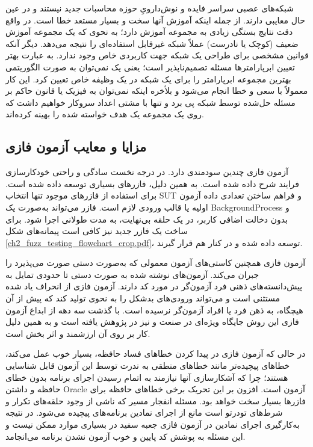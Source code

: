شبکه‌های عصبی سراسر فایده و نوش‌دارویِ حوزه محاسبات جدید نیستند و در عین حال معایبی دارند. از جمله اینکه آموزش آنها سخت و بسیار مستعد خطا است. در واقع دقت نتایج بستگی زیادی به مجموعه آموزش دارد؛ به نحوی که یک مجموعه آموزش ضعیف (کوچک یا نادرست) عملاً شبکه غیرقابل استفاده‌ای را نتیجه می‌دهد. دیگر آنکه قوانین مشخصی برای طراحی یک شبکه جهت کاربردی خاص وجود ندارد. به عبارت بهتر تعیین ابرپارامترها مسئله تصمیم‌ناپذیر است؛ یعنی یک نمی‌توان به صورت الگوریتمی بهترین مجموعه ابرپارامتر را برای یک شبکه در یک وظیفه خاص تعیین کرد. این کار معمولاً با سعی و خطا انجام می‌شود و بلأخره اینکه نمی‌توان به فیزیک یا قانون حاکم بر مسئله حل‌شده توسط شبکه پی برد و تنها با مشتی اعداد سروکار خواهیم داشت که روی یک مجموعه یک هدف خواسته شده را بهینه کرده‌اند. 


\subsection{مزایا و معایب آزمون فازی}
آزمون فازی چندین سودمندی دارد. در درجه نخست سادگی و راحتی خودکارسازی فرایند شرح داده شده است. به همین دلیل، فازرهای بسیاری توسعه داده شده است. برای استفاده از فازرهای موجود تنها انتخاب \gls{SUT} و فراهم ساختن تعدادی داده آزمون اولیه یا قالب ورودی لازم است. فازر می‌تواند به‌صورت یک \gls{BackgroundProcess} و بدون دخالت اضافی کاربر، در یک حلقه بی‌نهایت، به مدت طولانی اجرا شود. برای ساخت یک فازر جدید نیز کافی است پیمانه‌های ‏شکل \ref{ch2_fuzz_testing_flowchart_crop.pdf}، توسعه داده شده و در کنار هم قرار گیرند. 

آزمون فازی همچنین کاستی‌های آزمون معمولی که به‌صورت دستی صورت می‌پذیرد را جبران می‌کند. آزمون‌های نوشته شده به صورت دستی تا حدودی تمایل به پیش‌دانسته‌های ذهنی فرد آزمون‌گر در مورد کد دارند. آزمون فازی از انحراف یاد شده مستثنی است و می‌تواند ورودی‌های بدشکل را به نحوی تولید کند که پیش از آن هیچگاه، به ذهن فرد یا افراد آزمون‌گر نرسیده است. با گذشت سه دهه از ابداع آزمون فازی این روش جایگاه ویژه‌ای در صنعت و نیز در پژوهش یافته است و به همین دلیل کار بر روی آن ارزشمند و اثر بخش است.

در حالی که آزمون فازی در پیدا کردن خطاهای فساد حافظه، بسیار خوب عمل می‌کند، خطاهای پیچیده‌تر مانند خطاهای منطقی به ندرت توسط این آزمون قابل شناسایی هستند؛ چرا که آشکارسازی آنها نیازمند به اتمام رسیدن اجرای برنامه بدون خطای حافظه و داشتن \gls{Oracle} آزمون است. افزون بر این تحریک برخی خطاهای حافظه برای فازرها بسیار سخت خواهد بود. مسئله انفجار مسیر که ناشی از وجود حلقه‌های تکرار و شرط‌های تودرتو است مانع از اجرای نمادین برنامه‌های پیچیده می‌شود. در نتیجه به‌کارگیری اجرای نمادین در آزمون فازی جعبه سفید در بسیاری موارد ممکن نیست و این مسئله به پوشش کد پایین و خوب آزمون نشدن برنامه می‌انجامد.

